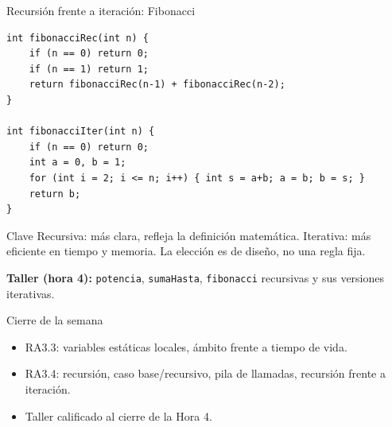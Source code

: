 \documentclass[11pt]{beamer}
\begin{document}
\begin{frame}[fragile]{Recursión frente a iteración: Fibonacci}
\begin{lstlisting}
int fibonacciRec(int n) {
    if (n == 0) return 0;
    if (n == 1) return 1;
    return fibonacciRec(n-1) + fibonacciRec(n-2);
}

int fibonacciIter(int n) {
    if (n == 0) return 0;
    int a = 0, b = 1;
    for (int i = 2; i <= n; i++) { int s = a+b; a = b; b = s; }
    return b;
}
\end{lstlisting}
  \begin{alertblock}{Clave}
    Recursiva: más clara, refleja la definición matemática. Iterativa: más eficiente en tiempo y
    memoria. La elección es de diseño, no una regla fija.
  \end{alertblock}
  \vfill
  \textbf{Taller (hora 4):} \texttt{potencia}, \texttt{sumaHasta}, \texttt{fibonacci} recursivas
  y sus versiones iterativas.
\end{frame}

\begin{frame}{Cierre de la semana}
  \begin{itemize}
    \item RA3.3: variables estáticas locales, ámbito frente a tiempo de vida.
    \item RA3.4: recursión, caso base/recursivo, pila de llamadas, recursión frente a iteración.
    \item Taller calificado al cierre de la Hora 4.
  \end{itemize}
\end{frame}
\end{document}
